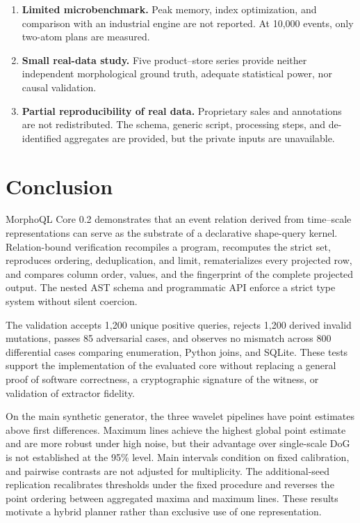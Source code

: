 \documentclass[11pt,a4paper]{article}
\begin{document}
\begin{enumerate}
  \item \textbf{Limited microbenchmark.} Peak memory, index optimization, and comparison with an industrial engine are not reported. At 10,000 events, only two-atom plans are measured.
  \item \textbf{Small real-data study.} Five product--store series provide neither independent morphological ground truth, adequate statistical power, nor causal validation.
  \item \textbf{Partial reproducibility of real data.} Proprietary sales and annotations are not redistributed. The schema, generic script, processing steps, and de-identified aggregates are provided, but the private inputs are unavailable.
\end{enumerate}

\section{Conclusion}

MorphoQL Core 0.2 demonstrates that an event relation derived from time--scale representations can serve as the substrate of a declarative shape-query kernel. Relation-bound verification recompiles a program, recomputes the strict set, reproduces ordering, deduplication, and limit, rematerializes every projected row, and compares column order, values, and the fingerprint of the complete projected output. The nested AST schema and programmatic API enforce a strict type system without silent coercion.

The validation accepts 1,200 unique positive queries, rejects 1,200 derived invalid mutations, passes 85 adversarial cases, and observes no mismatch across 800 differential cases comparing enumeration, Python joins, and SQLite. These tests support the implementation of the evaluated core without replacing a general proof of software correctness, a cryptographic signature of the witness, or validation of extractor fidelity.

On the main synthetic generator, the three wavelet pipelines have point estimates above first differences. Maximum lines achieve the highest global point estimate and are more robust under high noise, but their advantage over single-scale DoG is not established at the 95\% level. Main intervals condition on fixed calibration, and pairwise contrasts are not adjusted for multiplicity. The additional-seed replication recalibrates thresholds under the fixed procedure and reverses the point ordering between aggregated maxima and maximum lines. These results motivate a hybrid planner rather than exclusive use of one representation.
\end{document}
